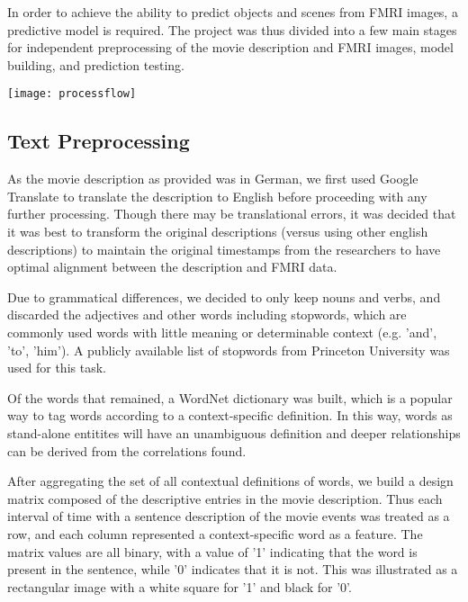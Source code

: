 

\par In order to achieve the ability to predict objects and scenes 
from FMRI images, a predictive model is required. The project was thus 
divided into a few main stages for independent preprocessing of the 
movie description and FMRI images, model building, and prediction
testing.

\centerline{\texttt{[image: processflow]}}

\subsection{Text Preprocessing}
\par As the movie description as provided was in German, we first used Google
Translate to translate the description to English before proceeding with 
any further processing. Though there may be translational errors, it was decided
that it was best to transform the original descriptions (versus using other english descriptions) to maintain the original timestamps from the researchers
to have optimal alignment between the description and FMRI data.

\par Due to grammatical differences, we decided to
 only keep nouns and verbs, and discarded the adjectives and other words including
 stopwords, which are commonly used words with little meaning or determinable context (e.g. 'and', 'to', 'him'). A publicly available list of stopwords from Princeton University was used for this task. 

 \par Of the words that remained, a WordNet dictionary was built, which is a 
 popular way to tag words according to a context-specific definition. In this way,
 words as stand-alone entitites will have an unambiguous definition and 
 deeper relationships can be derived from the correlations found. 

 \par After aggregating the set of all contextual definitions of words,
 we build a design matrix composed of the descriptive entries in the movie description.
 Thus each interval of time with a sentence description of the movie events was treated
 as a row, and each column represented a context-specific word as a feature. The matrix values are all binary, with a value of '1' indicating that the word is present in the sentence, while '0' indicates that it is not. This was illustrated as a rectangular image
 with a white square for '1' and black for '0'. 

